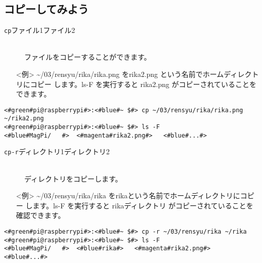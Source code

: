 \newpage
\subsection{コピーしてみよう}
\begin{description}
\item[\texttt{cp}\textvisiblespace ファイル1\textvisiblespace ファイル2]\mbox{}\\
ファイルをコピーすることができます。
\end{description}
\begin{itemize}
\item[<例>]\textasciitilde /03/rensyu/rika/rika.png をrika2.png という名前でホームディレクトリにコピー
します。ls\textvisiblespace -F を実行すると rika2.png がコピーされていることをできます。
\end{itemize}
\begin{lstlisting}[caption=cpの例, label=cp]
<#green#pi@raspberrypi#>:<#blue#~ $#> cp ~/03/rensyu/rika/rika.png ~/rika2.png
<#green#pi@raspberrypi#>:<#blue#~ $#> ls -F
<#blue#MagPi/	#>	<#magenta#rika2.png#>	<#blue#...#>
\end{lstlisting}
\begin{description}
\item[\texttt{cp}\textvisiblespace \texttt{-r}\textvisiblespace ディレクトリ1\textvisiblespace ディレクトリ2]\mbox{}\\
ディレクトリをコピーします。
\end{description}
\begin{itemize}
\item[<例>]\textasciitilde /03/rensyu/rika/rika をrikaという名前でホームディレクトリにコピー
します。ls\textvisiblespace -F を実行すると rikaディレクトリ がコピーされていることを確認できます。
\end{itemize}
\begin{lstlisting}[caption=cp -rの例, label=cp-R]
<#green#pi@raspberrypi#>:<#blue#~ $#> cp -r ~/03/rensyu/rika ~/rika
<#green#pi@raspberrypi#>:<#blue#~ $#> ls -F
<#blue#MagPi/	#>	<#blue#rika#>	<#magenta#rika2.png#>	<#blue#...#>
\end{lstlisting}
\begin{tcolorbox}[title=\useOmetoi]
\begin{enumerate}
\end{enumerate}
\end{tcolorbox}
